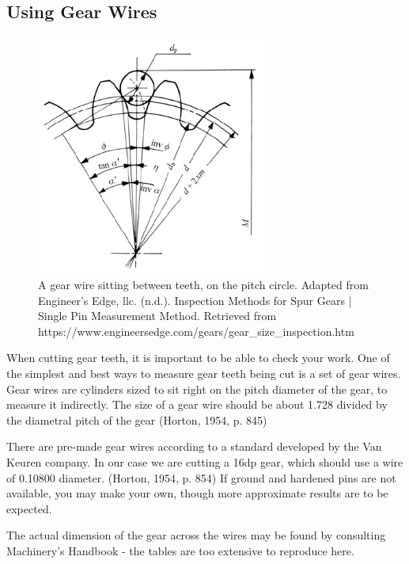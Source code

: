 \documentclass[12pt,twoside,letterpaper]{article}
\begin{document}
\subsection{Using Gear Wires}
\begin{figure}[H]
	\centering
	\includegraphics[width=3in]{gearInspEngEdge}
	\caption{A gear wire sitting between teeth, on the pitch circle. Adapted from Engineer's Edge, llc. (n.d.). Inspection Methods for Spur Gears | Single Pin Measurement Method. Retrieved from https://www.engineersedge.com/gears/gear\_size\_inspection.htm }
\end{figure}

When cutting gear teeth, it is important to be able to check your work. One of the simplest and best ways to measure gear teeth being cut is a set of gear wires. Gear wires are cylinders sized to sit right on the pitch diameter of the gear, to measure it indirectly. The size of a gear wire should be about 1.728 divided by the diametral pitch of the gear (Horton, 1954, p. 845) 

There are pre-made gear wires according to a standard developed by the Van Keuren company. In our case we are cutting a 16dp gear, which should use a wire of 0.10800 diameter. (Horton, 1954, p. 854)  If ground and hardened pins are not available, you may make your own, though more approximate results are to be expected. 

The actual dimension of the gear across the wires may be found by consulting Machinery's Handbook - the tables are too extensive to reproduce here.
\end{document}
